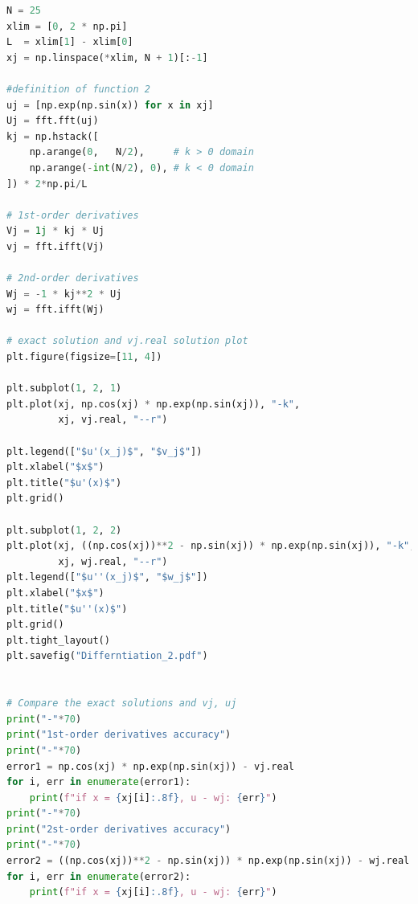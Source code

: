 \documentclass[11pt]{article}
\begin{document}
\begin{lstlisting}[language=Python]
N = 25
xlim = [0, 2 * np.pi]
L  = xlim[1] - xlim[0]
xj = np.linspace(*xlim, N + 1)[:-1]

#definition of function 2
uj = [np.exp(np.sin(x)) for x in xj]
Uj = fft.fft(uj)
kj = np.hstack([
    np.arange(0,   N/2),     # k > 0 domain
    np.arange(-int(N/2), 0), # k < 0 domain
]) * 2*np.pi/L

# 1st-order derivatives
Vj = 1j * kj * Uj
vj = fft.ifft(Vj)

# 2nd-order derivatives
Wj = -1 * kj**2 * Uj
wj = fft.ifft(Wj)

# exact solution and vj.real solution plot
plt.figure(figsize=[11, 4])

plt.subplot(1, 2, 1)
plt.plot(xj, np.cos(xj) * np.exp(np.sin(xj)), "-k",
         xj, vj.real, "--r")

plt.legend(["$u'(x_j)$", "$v_j$"])
plt.xlabel("$x$")
plt.title("$u'(x)$")
plt.grid()

plt.subplot(1, 2, 2)
plt.plot(xj, ((np.cos(xj))**2 - np.sin(xj)) * np.exp(np.sin(xj)), "-k",
         xj, wj.real, "--r")
plt.legend(["$u''(x_j)$", "$w_j$"])
plt.xlabel("$x$")
plt.title("$u''(x)$")
plt.grid()
plt.tight_layout()
plt.savefig("Differntiation_2.pdf")


# Compare the exact solutions and vj, uj
print("-"*70)
print("1st-order derivatives accuracy")
print("-"*70)
error1 = np.cos(xj) * np.exp(np.sin(xj)) - vj.real 
for i, err in enumerate(error1):
    print(f"if x = {xj[i]:.8f}, u - wj: {err}")
print("-"*70)
print("2st-order derivatives accuracy")
print("-"*70)
error2 = ((np.cos(xj))**2 - np.sin(xj)) * np.exp(np.sin(xj)) - wj.real 
for i, err in enumerate(error2):
    print(f"if x = {xj[i]:.8f}, u - wj: {err}")
    

\end{lstlisting}
\end{document}
